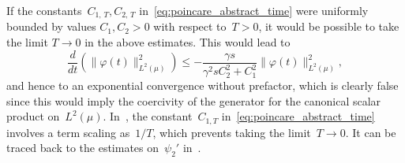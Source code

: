 \documentclass[AHL,Unicode,longabstracts,MathTools,published]{cedram}
\renewcommand{\leq}{\leqslant}
\begin{document}
\begin{rema}\label{rmk:false}
If the constants~$C_{1,\,T},C_{2,\,T}$ in~\eqref{eq:poincare_abstract_time} were uniformly bounded by values $C_1,C_2>0$ with respect to~$T > 0$, it would be possible to take the limit $T \to 0$ in the above estimates. This would lead to
\[
\frac{d}{dt} \left(\|\varphi(t)\|_{L^2(\mu)}^2 \right) \leq -\frac{\gamma s}{\gamma^2 sC_{2}^2 + C_{1}^2} \|\varphi(t)\|_{L^2(\mu)}^2,
\]
and hence to an exponential convergence without prefactor, which is clearly false since this would imply the coercivity of the generator for the canonical scalar product on~$L^2(\mu)$. In~\cite{CLW19}, the constant~$C_{1,T}$ in~\eqref{eq:poincare_abstract_time} involves a term scaling as~$1/T$, which prevents taking the limit~$T \to 0$. It can be traced back to the estimates on~$\psi_2'$ in~\cite[Lemma~2.6]{CLW19}.
\end{rema}
\vspace{30pt}


\end{document}
